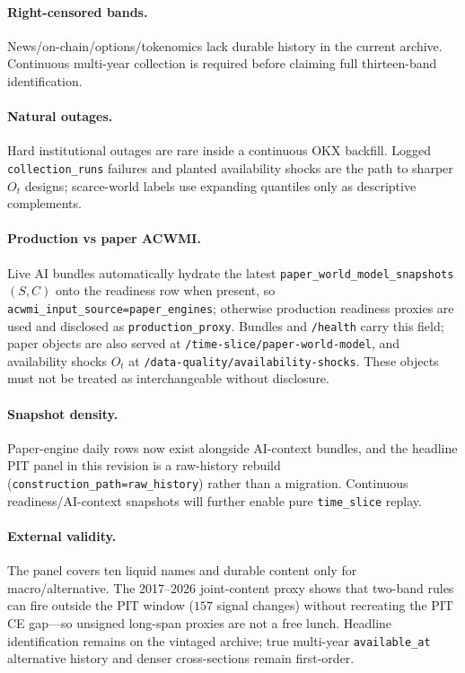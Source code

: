 \documentclass[12pt]{article}
\begin{document}
\paragraph{Right-censored bands.}
News/on-chain/options/tokenomics lack durable history in the current archive. Continuous multi-year collection is required before claiming full thirteen-band identification.

\paragraph{Natural outages.}
Hard institutional outages are rare inside a continuous OKX backfill. Logged \texttt{collection\_runs} failures and planted availability shocks are the path to sharper $O_t$ designs; scarce-world labels use expanding quantiles only as descriptive complements.

\paragraph{Production vs paper ACWMI.}
Live AI bundles automatically hydrate the latest \texttt{paper\_world\_model\_snapshots} $(S,C)$ onto the readiness row when present, so \texttt{acwmi\_input\_source=paper\_engines}; otherwise production readiness proxies are used and disclosed as \texttt{production\_proxy}. Bundles and \texttt{/health} carry this field; paper objects are also served at \texttt{/time-slice/paper-world-model}, and availability shocks $O_t$ at \texttt{/data-quality/availability-shocks}. These objects must not be treated as interchangeable without disclosure.

\paragraph{Snapshot density.}
Paper-engine daily rows now exist alongside AI-context bundles, and the headline PIT panel in this revision is a raw-history rebuild (\texttt{construction\_path=raw\_history}) rather than a migration. Continuous readiness/AI-context snapshots will further enable pure \texttt{time\_slice} replay.

\paragraph{External validity.}
The panel covers ten liquid names and durable content only for macro/alternative. The 2017--2026 joint-content proxy shows that two-band rules can fire outside the PIT window ($157$ signal changes) without recreating the PIT CE gap---so unsigned long-span proxies are not a free lunch. Headline identification remains on the vintaged archive; true multi-year \texttt{available\_at} alternative history and denser cross-sections remain first-order.
\end{document}
